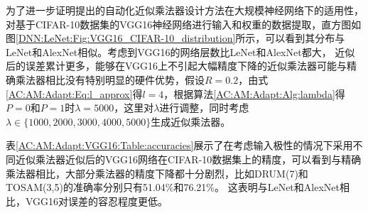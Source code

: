 为了进一步证明提出的自动化近似乘法器设计方法在大规模神经网络下的适用性，对基于CIFAR-10数据集\cite{DNN:CIFAR-10}的VGG16神经网络\cite{DNN:VGG16}进行输入和权重的数据提取，直方图如图\ref{DNN:LeNet:Fig:VGG16_CIFAR-10_distribution}所示，可以看到其分布与LeNet和AlexNet相似。考虑到VGG16的网络层数比LeNet和AlexNet都大，
近似后的误差累计更多，能够在VGG16上不引起大幅精度下降的近似乘法器可能与精确乘法器相比没有特别明显的硬件优势，假设$R=0.2$，由式\eqref{AC:AM:Adapt:Eq:l_approx}得$l=4$，根据算法\ref{AC:AM:Adapt:Alg:lambda}得$P=0$和$P=1$时$\lambda=5000$，这里对$\lambda$进行调整，同时考虑$\lambda \in \{1000,2000,3000,4000,5000\}$生成近似乘法器。
\begin{table}[ht]
    \renewcommand{\arraystretch}{1.3}
    \setlength\tabcolsep{3.76pt}
    \caption{采用不同近似乘法器近似后的VGG16网络在CIFAR-10数据集的精度}
    \label{AC:AM:Adapt:VGG16:Table:accuracies}
    \centering
\end{table}
表\ref{AC:AM:Adapt:VGG16:Table:accuracies}展示了在考虑输入极性的情况下采用不同近似乘法器近似后的VGG16网络\cite{DNN:VGG16}在CIFAR-10数据集\cite{DNN:CIFAR-10}上的精度，可以看到与精确乘法器相比，大部分乘法器的精度下降都十分剧烈，比如DRUM(7)和TOSAM(3,5)的准确率分别只有51.04\%和76.21\%。
这表明与LeNet和AlexNet相比，VGG16对误差的容忍程度更低。

